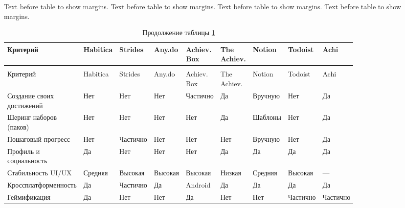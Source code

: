 \documentclass[a4paper,14pt]{extarticle}
\begin{document}
\noindent
Text before table to show margins. Text before table to show margins. Text before table to show margins. Text before table to show margins. 

\begingroup
\setlength{\tabcolsep}{3pt}
\footnotesize
\begin{longtable}[t]{
	|>{\RaggedRight\arraybackslash}p{0.18\linewidth}|
	>{\centering\arraybackslash}p{0.08\linewidth}|
	>{\centering\arraybackslash}p{0.08\linewidth}|
	>{\centering\arraybackslash}p{0.08\linewidth}|
	>{\centering\arraybackslash}p{0.09\linewidth}|
	>{\centering\arraybackslash}p{0.09\linewidth}|
	>{\centering\arraybackslash}p{0.08\linewidth}|
	>{\centering\arraybackslash}p{0.08\linewidth}|
	>{\centering\arraybackslash}p{0.07\linewidth}|
}
\caption{Сравнительный анализ аналогов} \label{tab:analogs-compare}\\
\hline
Критерий & Habitica & Strides & Any.do & Achiev. Box & The Achiev. & Notion & Todoist & Achi \\
\hline
\endfirsthead
\caption*{Продолжение таблицы \ref{tab:analogs-compare}}\\
\hline
Критерий & Habitica & Strides & Any.do & Achiev. Box & The Achiev. & Notion & Todoist & Achi \\
\hline
\endhead
\hline
\endfoot
\hline
\endlastfoot
Создание своих достижений & Нет & Нет & Нет & Частично & Да & Вручную & Нет & Да \\
\hline
Шеринг наборов (паков) & Нет & Нет & Нет & Нет & Да & Шаблоны & Нет & Да \\
\hline
Пошаговый прогресс & Нет & Частично & Нет & Нет & Нет & Вручную & Нет & Да \\
\hline
Профиль и социальность & Да & Нет & Нет & Нет & Да & Да & Да & Да \\
\hline
Стабильность UI/UX & Средняя & Высокая & Высокая & Высокая & Низкая & Средняя & Высокая & --- \\
\hline
Кроссплатформенность & Да & Частично & Да & Android & Да & Да & Да & Да \\
\hline
Геймификация & Да & Нет & Нет & Да & Нет & Нет & Частично & Частично \\
\end{longtable}
\endgroup
\end{document}
